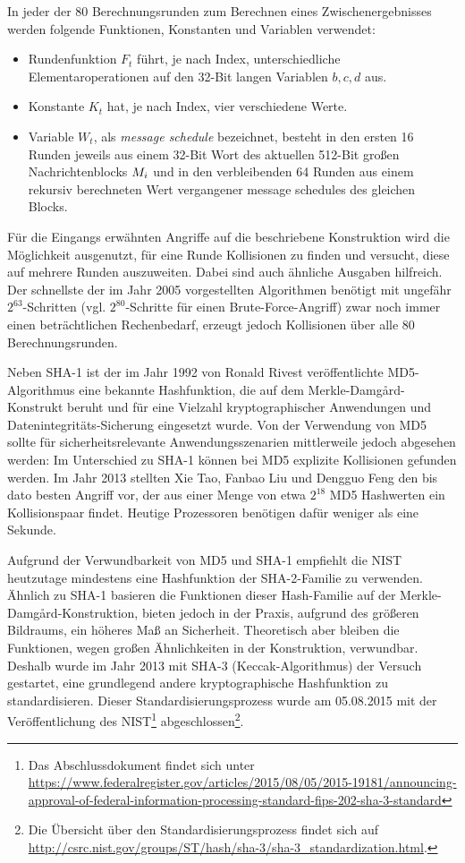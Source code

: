 In jeder der 80 Berechnungsrunden zum Berechnen eines Zwischenergebnisses werden folgende Funktionen, Konstanten und Variablen verwendet:
\begin{itemize}
	\item Rundenfunktion $F_{t}$ führt, je nach Index, unterschiedliche Elementaroperationen auf den 32-Bit langen Variablen $b, c, d$ aus.
	\item Konstante $K_{t}$ hat, je nach Index, vier verschiedene Werte.
	\item Variable $W_{t}$, als \textit{message schedule} bezeichnet, besteht in den ersten 16 Runden jeweils aus einem 32-Bit Wort des aktuellen 512-Bit großen Nachrichtenblocks $M_{i}$ und in den verbleibenden 64 Runden aus einem rekursiv berechneten Wert vergangener message schedules des gleichen Blocks.
\end{itemize}

Für die Eingangs erwähnten Angriffe auf die beschriebene Konstruktion wird die Möglichkeit ausgenutzt, für eine Runde Kollisionen zu finden und versucht, diese auf mehrere Runden auszuweiten. Dabei sind auch ähnliche Ausgaben hilfreich. Der schnellste der im Jahr 2005 vorgestellten Algorithmen benötigt mit ungefähr $2^{63}$-Schritten (vgl. $2^{80}$-Schritte für einen Brute-Force-Angriff) zwar noch immer einen beträchtlichen Rechenbedarf, erzeugt jedoch Kollisionen über alle 80 Berechnungsrunden.

Neben SHA-1 ist der im Jahr 1992 von Ronald Rivest veröffentlichte MD5-Algorithmus eine bekannte Hashfunktion, die auf dem Merkle-Damgård-Konstrukt beruht und für eine Vielzahl kryptographischer Anwendungen und Datenintegritäts-Sicherung eingesetzt wurde. Von der Verwendung von MD5 sollte für sicherheitsrelevante Anwendungsszenarien mittlerweile jedoch abgesehen werden: Im Unterschied zu SHA-1 können bei MD5 explizite Kollisionen gefunden werden. Im Jahr 2013 stellten Xie Tao, Fanbao Liu und Dengguo Feng den bis dato besten Angriff vor, der aus einer Menge von etwa $2^{18}$ MD5 Hashwerten ein Kollisionspaar findet. Heutige Prozessoren benötigen dafür weniger als eine Sekunde.

Aufgrund der Verwundbarkeit von MD5 und SHA-1 empfiehlt die NIST
heutzutage mindestens eine Hashfunktion der SHA-2-Familie zu
verwenden. Ähnlich zu SHA-1 basieren die Funktionen dieser Hash-Familie
auf der Merkle-Damgård-Konstruktion, bieten jedoch in der Praxis,
aufgrund des größeren Bildraums, ein höheres Maß an
Sicherheit. Theoretisch aber bleiben die Funktionen, wegen großen
Ähnlichkeiten in der Konstruktion, verwundbar. Deshalb wurde im Jahr
2013 mit SHA-3 (\glqq Keccak\grqq{}-Algorithmus) der Versuch gestartet,
eine grundlegend andere kryptographische Hashfunktion zu
standardisieren. Dieser Standardisierungsprozess wurde am 05.08.2015 mit
der Veröffentlichung des NIST\footnote{Das Abschlussdokument findet sich
unter \url{https://www.federalregister.gov/articles/2015/08/05/2015-19181/announcing-approval-of-federal-information-processing-standard-fips-202-sha-3-standard}} abgeschlossen\footnote{Die Übersicht über den Standardisierungsprozess findet sich auf \url{http://csrc.nist.gov/groups/ST/hash/sha-3/sha-3_standardization.html}.}.

